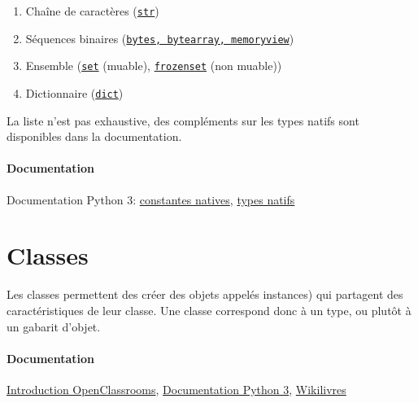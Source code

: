 \documentclass[a4paper, 10pt]{article}
\newcommand{\code}[1]{{\small\texttt{#1}}}
\begin{document}
\begin{enumerate}
        \item Chaîne de caractères (\href{https://docs.python.org/fr/3/library/string.html?highlight=str#module-string}{\code{str}})
		\item Séquences binaires (\href{https://docs.python.org/fr/3/library/stdtypes.html#binary-sequence-types-bytes-bytearray-memoryview}{\code{bytes, bytearray, memoryview}})
		\item Ensemble (\href{https://docs.python.org/fr/3/library/stdtypes.html#set-types-set-frozenset}{\code{set}} (muable), \href{https://docs.python.org/fr/3/library/stdtypes.html#set-types-set-frozenset}{\code{frozenset}} (non muable))
		\item Dictionnaire (\href{https://docs.python.org/fr/3/library/stdtypes.html#mapping-types-dict}{\code{dict}})
\end{enumerate}

La liste n'est pas exhaustive, des compléments sur les types natifs sont disponibles dans la documentation.

\paragraph{Documentation} Documentation Python 3: \href{https://docs.python.org/fr/3/library/constants.html}{constantes natives}, \href{https://docs.python.org/fr/3/library/stdtypes.html}{types natifs}
%

\section{Classes}

 Les classes permettent des créer des objets appelés instances) qui partagent des caractéristiques de leur classe. Une classe correspond donc à un type, ou plutôt à un gabarit d'objet.

\paragraph{Documentation} \href{https://openclassrooms.com/courses/apprenez-a-programmer-en-python/premiere-approche-des-classes}{Introduction OpenClassrooms}, \href{https://docs.python.org/fr/3/tutorial/classes.html}{Documentation Python 3}, \href{https://fr.wikibooks.org/wiki/Programmation_Python/Classes#Définition_d'une_classe_élé mentaire}{Wikilivres}
\end{document}
